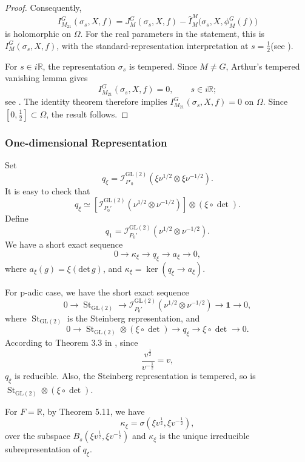 \documentclass[11pt]{amsart}
\renewcommand{\rm}{\mathrm}
\newcommand{\GGL}{\mathrm{GL}}
\theoremstyle{definition}
\numberwithin{equation}{section}
\begin{document}
\begin{proof}
Consequently,
\[
I_{M_{21}}^G(\sigma_s,X,f)
=
J_M^G(\sigma_s,X,f)-\widehat I_M^M
\bigl(\sigma_s,X,\phi_M^G(f)\bigr)
\]
is holomorphic on \(\Omega\). For the real parameters
in the statement, this is \(I_M^G(\sigma_s,X,f)\), with
the standard-representation interpretation at \(s=\frac{1}{2}\)(see \cite[\S\S5--7]{Art89}).

For \(s\in i\mathbb R\), the representation \(\sigma_s\)
is tempered. Since \(M\ne G\), Arthur's tempered vanishing
lemma gives
\[
I_{M_{21}}^G(\sigma_s,X,f)=0,\qquad s\in i\mathbb R;
\]
see \cite[Lemma~3.1]{Art88}.
The identity theorem therefore implies
\(I_{M_{21}}^G(\sigma_s,X,f)=0\) on \(\Omega\).
Since \([0,\frac12]\subset\Omega\), the result follows.
\end{proof}
	
	
	
	
	
	
	
	
	
	\subsubsection{One-dimensional Representation}\label{quotent}
	Set \[q_\xi = \mathscr{I}_{P'_0}^{\GGL(2)} \left( \xi \nu^{1/2} \otimes \xi \nu^{-1/2} \right).\]
	It is easy to check that
	\[q_\xi \simeq \left[ \mathscr{I}_{P_0'}^{\GGL(2)} \left( \nu^{1/2} \otimes \nu^{-1/2} \right) \right] \otimes (\xi \circ \det).\]
	Define \[q_1=\mathscr{I}_{P_0'}^{\GGL(2)} \left( \nu^{1/2} \otimes \nu^{-1/2} \right) .\]
	We have a short exact sequence
	\[
	0 \longrightarrow \kappa_\xi \longrightarrow q_\xi \longrightarrow a_\xi \longrightarrow 0,
	\]where \(a_\xi(g)=\xi(\rm{det}\,g)\), and \(
	\kappa_\xi = \ker(q_\xi \longrightarrow a_\xi)
	\).
	
	
	For p-adic case, we have the short exact sequence
	\[0 \longrightarrow \operatorname{St}_{\GGL(2)} \longrightarrow \mathscr{I}_{P_0'}^{\GGL(2)} \left( \nu^{1/2} \otimes \nu^{-1/2} \right) \longrightarrow \mathbf{1} \longrightarrow 0,\]where \( \operatorname{St}_{\GGL(2)}\) is the Steinberg representation, and 
	\[0 \longrightarrow \operatorname{St}_{\GGL(2)} \otimes (\xi \circ \det) \longrightarrow q_\xi \longrightarrow \xi \circ \det \longrightarrow 0.\]According to Theorem 3.3 in \cite{JL70}, since \[\frac{v^{\frac{1}{2}}}{v^{-\frac{1}{2}}}=v,\]\(q_\xi\) is reducible.
    Also, the Steinberg representation is tempered, so is \(\operatorname{St}_{\GGL(2)} \otimes (\xi \circ \det) \).
	
	
	For \(F=\mathbb{R}\), by Theorem 5.11, we have  \[\kappa_\xi=\sigma(\xi v^{\frac{1}{2}},\xi v^{-\frac{1}{2}}),\]over the subspace \(B_s(\xi v^{\frac{1}{2}},\xi v^{-\frac{1}{2}})\) 
	and \(\kappa_\xi\) is the unique irreducible subrepresentation of \(q_\xi\).
	
\end{document}

